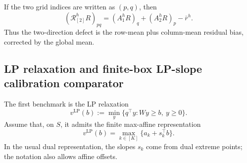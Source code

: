 \documentclass[11pt,letterpaper]{article}
\theoremstyle{definition}
\theoremstyle{remark}
\newcommand{\LP}{\mathrm{LP}}
\begin{document}

If the two grid indices are written as $(p,q)$, then
$$
(\mathcal R_{[2]}^hR)_{pq}
=
(A_1^hR)_q+(A_2^hR)_p-\bar r^h.
$$
Thus the two-direction defect is the row-mean plus column-mean residual bias,
corrected by the global mean.

\subsection{LP relaxation and finite-box LP-slope calibration comparator } 
\label{subsec:framework_shifted_lp}

The first benchmark is the LP relaxation
\begin{equation}
\label{eq:framework_lp_primal_definition}
v^{\LP}(b)
:=
\min_y
\{q^\top y:Wy\ge b,\ y\ge0\}.
\end{equation}
Assume that, on $S$, it admits the finite max-affine representation
\begin{equation}
\label{eq:framework_lp_max_affine_definition}
v^{\LP}(b)
=
\max_{k\in[K]}\{a_k+s_k^\top b\}.
\end{equation}
In the usual dual representation, the slopes $s_k$ come from dual extreme
points; the notation also allows affine offsets.
\end{document}
